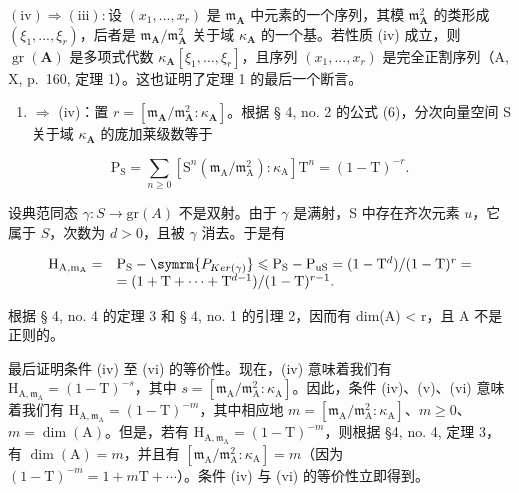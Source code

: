 \((\mathrm{iv}) \Rightarrow (\mathrm{iii}) : \text{设 } (x_1, ..., x_r)\) 是 \(\mathfrak{m}_{\mathbf{A}}\) 中元素的一个序列，其模 \(\mathfrak{m}_{\mathbf{A}}^2\) 的类形成 \((\xi_1, ..., \xi_r)\)，后者是 \(\mathfrak{m}_{\mathbf{A}} / \mathfrak{m}_{\mathbf{A}}^2\) 关于域 \(\kappa_{\mathbf{A}}\) 的一个基。若性质 (iv) 成立，则 \(\operatorname{gr}(\mathbf{A})\) 是多项式代数 \(\kappa_{\mathbf{A}}[\xi_1, ..., \xi_r]\)，且序列 \((x_1, ..., x_r)\) 是完全正割序列（A, X, p.~160, 定理 1）。这也证明了定理 1 的最后一个断言。

\begin{enumerate}
\def\labelenumi{(\roman{enumi})}
\tightlist
\item
  \(\Rightarrow\) (iv)：置 \(r = [\mathfrak{m}_{\mathbf{A}} / \mathfrak{m}_{\mathbf{A}}^{2}:\kappa_{\mathbf{A}}]\)。根据 § 4, no. 2 的公式 (6)，分次向量空间 S 关于域 \(\kappa_{\mathbf{A}}\) 的庞加莱级数等于
\end{enumerate}

\[
\mathrm{P} _ {\mathrm{S}} = \sum_ {n \geqslant 0} \left[ \mathrm{S} ^ {n} (\mathfrak {m} _ {\mathrm{A}} / \mathfrak {m} _ {\mathrm{A}} ^ {2}): \kappa_ {\mathrm{A}} \right] \mathrm{T} ^ {n} = (1 - \mathrm{T}) ^ {- r}.
\]

设典范同态 \(\gamma: S \to \mathrm{gr}(A)\) 不是双射。由于 \(\gamma\) 是满射，S 中存在齐次元素 \(u\)，它属于 \(S\)，次数为 \(d > 0\)，且被 \(\gamma\) 消去。于是有

\[
\begin{array}{r l} \mathrm {H_ {A,m_ {A}}} = & \mathrm {P_ {S}} - \symrm {P_ {Ker(\gamma)}} \leqslant \mathrm {P_ {S}} - \mathrm {P_ {uS}} = (1 - \mathrm{T} ^ {d}) / (1 - \mathrm{T}) ^ {r} = \\ & = (1 + \mathrm{T} + \dots + \mathrm{T} ^ {d - 1}) / (1 - \mathrm{T}) ^ {r - 1}. \end{array}
\]

根据 § 4, no. 4 的定理 3 和 § 4, no. 1 的引理 2，因而有 dim(A) \textless{} r，且 A 不是正则的。

最后证明条件 (iv) 至 (vi) 的等价性。现在，(iv) 意味着我们有 \(\mathrm{H}_{\mathrm{A},\mathfrak{m}_{\mathrm{A}}}=(1-\mathrm{T})^{-s}\)，其中 \(s=[\mathfrak{m}_{\mathrm{A}}/\mathfrak{m}_{\mathrm{A}}^{2}:\kappa_{\mathrm{A}}]\)。因此，条件 (iv)、(v)、(vi) 意味着我们有 \(\mathrm{H}_{\mathrm{A},\mathfrak{m}_{\mathrm{A}}}=(1-\mathrm{T})^{-m}\)，其中相应地 \(m=[\mathfrak{m}_{\mathrm{A}}/\mathfrak{m}_{\mathrm{A}}^{2}:\kappa_{\mathrm{A}}]\)、\(m\geqslant0\)、\(m=\dim(\mathrm{A})\)。但是，若有 \(\mathrm{H}_{\mathrm{A},\mathfrak{m}_{\mathrm{A}}}=(1-\mathrm{T})^{-m}\)，则根据 §4, no. 4, 定理 3，有 \(\dim(\mathrm{A})=m\)，并且有 \([\mathfrak{m}_{\mathrm{A}}/\mathfrak{m}_{\mathrm{A}}^{2}:\kappa_{\mathrm{A}}]=m\)（因为 \((1-\mathrm{T})^{-m}=1+m\mathrm{T}+\cdots\)）。条件 (iv) 与 (vi) 的等价性立即得到。

